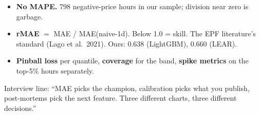\begin{itemize}
  \item \textbf{No MAPE.} 798 negative-price hours in our sample;
        division near zero is garbage.
  \item \textbf{rMAE} $=$ MAE / MAE(naive-1d). Below 1.0 = skill. The EPF
        literature's standard (Lago et al.\ 2021). Ours: 0.638 (LightGBM),
        0.660 (LEAR).
  \item \textbf{Pinball loss} per quantile, \textbf{coverage} for the
        band, \textbf{spike metrics} on the top-5\% hours separately.
\end{itemize}

Interview line: ``MAE picks the champion, calibration picks what you
publish, post-mortems pick the next feature. Three different charts,
three different decisions.''
